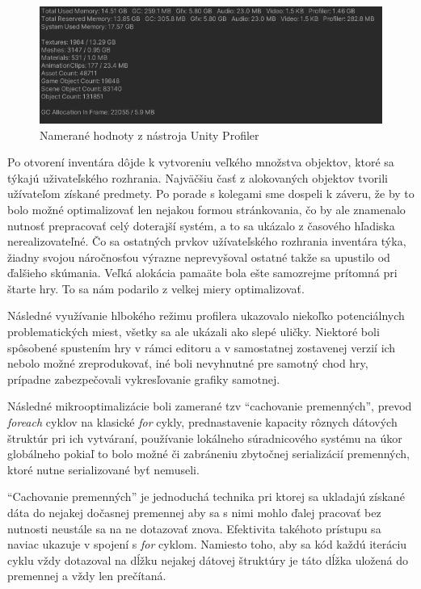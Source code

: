 \documentclass[slovak, bachelorpractice]{diploma}
\begin{document}
\begin{figure}[!htbp]
	\centering
	\includegraphics[width=1\textwidth]{Pictures/profiler.png}
	\caption{Namerané hodnoty z nástroja Unity Profiler}
	\label{pic:Prof}
\end{figure}

Po otvorení inventára dôjde k vytvoreniu veľkého množstva objektov, ktoré sa týkajú uživateľského rozhrania. Najväčšiu časť z alokovaných objektov tvorili užívateľom získané predmety. Po porade s kolegami sme dospeli k záveru, že by to bolo možné optimalizovať len nejakou formou stránkovania, čo by ale znamenalo nutnosť prepracovať celý doterajší systém, a to sa ukázalo z časového hľadiska nerealizovateľné. Čo sa ostatných prvkov užívateľského rozhrania inventára týka, žiadny svojou náročnosťou výrazne neprevyšoval ostatné takže sa upustilo od ďalšieho skúmania. Veľká alokácia pamaäte bola ešte samozrejme prítomná pri štarte hry. To sa nám podarilo z velkej miery optimalizovať.

Následné využívanie hlbokého režimu profilera ukazovalo niekoľko potenciálnych problematických miest, všetky sa ale ukázali ako slepé uličky. Niektoré boli spôsobené spustením hry v rámci editoru a v samostatnej zostavenej verzií ich nebolo možné zreprodukovať, iné boli nevyhnutné pre samotný chod hry, prípadne zabezpečovali vykresľovanie grafiky samotnej.

Následné mikrooptimalizácie boli zamerané tzv \enquote{cachovanie premenných}, prevod \textit{foreach} cyklov na klasické \textit{for} cykly, prednastavenie kapacity rôznych dátových štruktúr pri ich vytváraní, používanie lokálneho súradnicového systému na úkor globálneho pokiaľ to bolo možné či zabráneniu zbytočnej serializácií premenných, ktoré nutne serializované byť nemuseli.

\enquote{Cachovanie premenných} je jednoduchá technika pri ktorej sa ukladajú získané dáta do nejakej dočasnej premennej aby sa s nimi mohlo ďalej pracovať bez nutnosti neustále sa na ne dotazovať znova. Efektivita takéhoto prístupu sa naviac ukazuje v spojení s \textit{for} cyklom. Namiesto toho, aby sa kód každú iteráciu cyklu vždy dotazoval na dĺžku nejakej dátovej štruktúry je táto dĺžka uložená do premennej a vždy len prečítaná.
\end{document}
